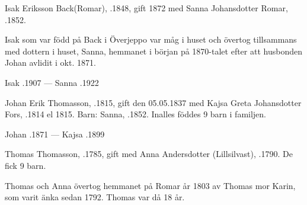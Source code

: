 Isak Eriksson Back(Romar), .1848, gift 1872 med Sanna Johansdotter Romar, .1852.
\begin{jhchildren}
  \item {}
  \item {}
  \item {}
  \item {}
  \item {}
  \item {}
  \item {}
\end{jhchildren}
Isak som var född på Back i Överjeppo var måg i huset och övertog tillsammans med dottern i huset, Sanna, hemmanet i början på 1870-talet efter att husbonden Johan avlidit i okt. 1871.

Isak .1907  ---  Sanna .1922


Johan Erik Thomasson, .1815, gift den 05.05.1837 med Kajsa Greta Johansdotter Fors, .1814 el 1815.
Barn: Sanna, .1852. Inalles föddes 9 barn i familjen.

Johan .1871  ---  Kajsa .1899


Thomas Thomasson, .1785, gift med Anna Andersdotter (Lillsilvast), .1790. De fick 9 barn.
\begin{jhchildren}
  \item {}
  \item {}
\end{jhchildren}
Thomas och Anna övertog hemmanet på Romar år 1803 av Thomas mor Karin, som varit änka sedan 1792. Thomas var då 18 år.

